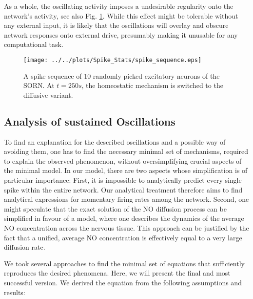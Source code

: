 \documentclass[10pt,a4paper]{article}
\begin{document}
As a whole, the oscillating activity imposes a undesirable regularity onto the network's activity, see also Fig. \ref{spike_sequence}. While this effect might be tolerable without any external input, it is likely that the oscillations will overlay and obscure network responses onto external drive, presumably making it unusable for any computational task.
\begin{figure}
\texttt{[image: ../../plots/Spike\_Stats/spike\_sequence.eps]}
\caption{A spike sequence of 10 randomly picked excitatory neurons of the SORN. At $t=250s$, the homeostatic mechanism is switched to the diffusive variant.}
\label{spike_sequence}
\end{figure}

\subsection{Analysis of sustained Oscillations}\label{theor_osc}

To find an explanation for the described oscillations and a possible way of avoiding them, one has to find the necessary minimal set of mechanisms, required to explain the observed phenomenon, without oversimplifying crucial aspects of the minimal model. In our model, there are two aspects whose simplification is of particular importance: First, it is impossible to analytically predict every single spike within the entire network. Our analytical treatment therefore aims to find analytical expressions for momentary firing rates among the network. Second, one might speculate that the exact solution of the NO diffusion process can be simplified in favour of a model, where one describes the dynamics of the average NO concentration across the nervous tissue. This approach can be justified by the fact that a unified, average NO concentration is effectively equal to a very large diffusion rate.

We took several approaches to find the minimal set of equations that sufficiently reproduces the desired phenomena. Here, we will present the final and most successful version. We derived the equation from the following assumptions and results:
\end{document}
